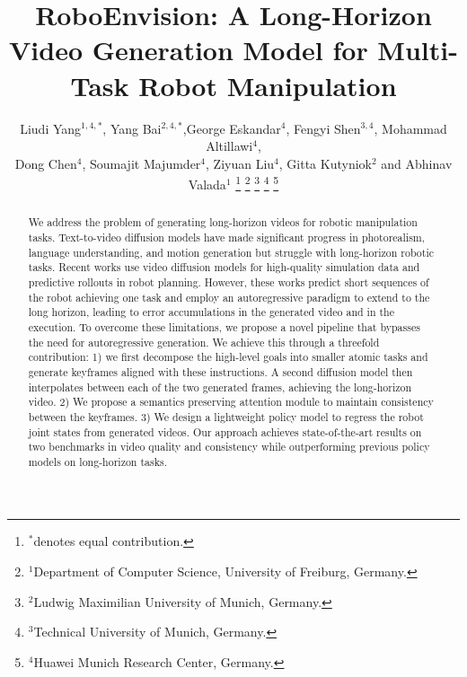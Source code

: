 \documentclass[letterpaper, 10 pt, conference]{ieeeconf}  %
\title{\LARGE \bf
RoboEnvision: A Long-Horizon Video Generation Model for Multi-Task Robot Manipulation
}
\author{Liudi Yang$^{1,4,*}$, Yang Bai$^{2,4,*}$,George Eskandar$^{4}$, Fengyi Shen$^{3,4}$, Mohammad Altillawi$^{4}$, \\ Dong Chen$^{4}$, Soumajit Majumder$^{4}$, Ziyuan Liu$^{4}$, Gitta Kutyniok$^{2}$ and Abhinav Valada$^1$%
\thanks{$^{*}$denotes equal contribution. }
\thanks{$^{1}$Department of Computer Science, University of Freiburg, Germany.}%
\thanks{$^{2}$Ludwig Maximilian University of Munich, Germany.}
\thanks{$^{3}$Technical University of Munich, Germany.}
\thanks{$^{4}$Huawei Munich Research Center, Germany.}%
}
\begin{document}
\maketitle
\thispagestyle{empty}
\pagestyle{empty}

\begin{abstract}
We address the problem of generating long-horizon videos for robotic manipulation tasks. Text-to-video diffusion models have made significant progress in photorealism, language understanding, and motion generation but struggle with long-horizon robotic tasks. Recent works use video diffusion models for high-quality simulation data and predictive rollouts in robot planning. However, these works predict short sequences of the robot achieving one task and employ an autoregressive paradigm to extend to the long horizon, leading to error accumulations in the generated video and in the execution. To overcome these limitations, we propose a novel pipeline that bypasses the need for autoregressive generation. We achieve this through a threefold contribution: 1) we first decompose the high-level goals into smaller atomic tasks and generate keyframes aligned with these instructions. A second diffusion model then interpolates between each of the two generated frames, achieving the long-horizon video. 2) We propose a semantics preserving attention module to maintain consistency between the keyframes. 3) We design a lightweight policy model to regress the robot joint states from generated videos. Our approach achieves state-of-the-art results on two benchmarks in video quality and consistency while outperforming previous policy models on long-horizon tasks. 



\end{abstract}
\end{document}
